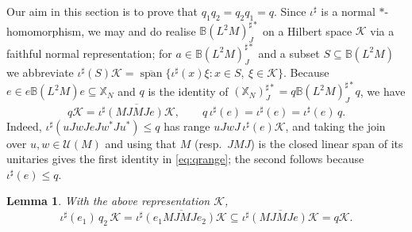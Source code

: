 \documentclass[a4paper, 11pt, reqno]{amsart}
\numberwithin{equation}{section}
\theoremstyle{plain}
\newtheorem{lemma}[thm]{Lemma}
\theoremstyle{remark}
\theoremstyle{definition}
\newcommand{\B}{\mathbb{B}}
\newcommand{\KK}{{\mathcal K}}
\newcommand{\XX}{{\mathbb{X}}}
\begin{document}
Our aim in this section is to prove that $q_1q_2=q_2q_1=q$. Since $\iota^\sharp$ is a normal $*$-homomorphism, we may and do realise $\B(L^2M)^{\sharp*}_J$ on a Hilbert space $\KK$ via a faithful normal representation; for $a\in\B(L^2M)^{\sharp*}_J$ and a subset $S\subseteq\B(L^2M)$ we abbreviate $\iota^\sharp(S)\KK=\overline{\operatorname{span}}\{\iota^\sharp(x)\xi:x\in S,\ \xi\in\KK\}$. Because $e\in e\B(L^2M)e\subseteq\XX_N$ and $q$ is the identity of $(\XX_N)^{\sharp*}_J=q\B(L^2M)^{\sharp*}_J q$, we have
\begin{equation}\label{eq:qrange}
q\KK=\overline{\iota^\sharp(MJMJe)\KK},\qquad q\,\iota^\sharp(e)=\iota^\sharp(e)=\iota^\sharp(e)\,q .
\end{equation}
Indeed, $\iota^\sharp(uJwJeJw^*Ju^*)\leq q$ has range $uJwJ\,\iota^\sharp(e)\KK$, and taking the join over $u,w\in\mathcal U(M)$ and using that $M$ (resp.\ $JMJ$) is the closed linear span of its unitaries gives the first identity in \eqref{eq:qrange}; the second follows because $\iota^\sharp(e)\leq q$.

\begin{lemma}\label{lem:range}
With the above representation $\KK$,
\[
\iota^\sharp(e_1)\,q_2\,\KK=\overline{\iota^\sharp(e_1MJMJe_2)\KK}\subseteq\overline{\iota^\sharp(MJMJe)\KK}=q\KK .
\]
\end{lemma}
\end{document}
